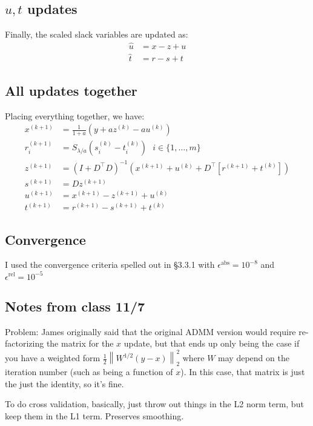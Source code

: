 \documentclass{article}
\newcommand{\norm}[1]{{ \ensuremath{ \left\lVert  #1 \right\rVert  }  }}
\begin{document}
\subsection{$u, t$ updates}
Finally, the scaled slack variables are updated as:
\begin{align*}
\hat{u}&=x-z+u\\
\hat{t}&=r-s+t
\end{align*}

\subsection{All updates together}
Placing everything together, we have:
\begin{align*}
x^{(k+1)}&=\frac{1}{1+a}\left(y+az^{(k)}-au^{(k)}\right)\\
r_i^{(k+1)}&=S_{\lambda/a}\left(s_i^{(k)}-t_i^{(k)}\right)~~~i\in\{1,\ldots, m\}\\
z^{(k+1)}&=(I+D^\top D)^{-1}\left(x^{(k+1)}+u^{(k)}+D^\top[r^{(k+1)}+t^{(k)}]\right)\\
s^{(k+1)}&=Dz^{(k+1)}\\
u^{(k+1)}&=x^{(k+1)}-z^{(k+1)}+u^{(k)}\\
t^{(k+1)}&=r^{(k+1)}-s^{(k+1)}+t^{(k)}
\end{align*}

\subsection{Convergence}
I used the convergence criteria spelled out in \cite{boyd2011distributed} \S3.3.1 with $\epsilon^{\textrm{abs}}=10^{-8}$ and $\epsilon^{\textrm{rel}}=10^{-5}$

\subsection{Notes from class 11/7}
Problem: James originally said that the original ADMM version would require re-factorizing the matrix for the $x$
update, but that ends up only being the case if you have a weighted form $\frac{1}{2}\norm{W^{1/2}(y-x)}_2^2$ where $W$ may depend on the iteration number (such as being a function of $x$). In this case, that matrix is just the
just the identity, so it's fine.

To do cross validation, basically, just throw out things in the L2 norm term, but keep them in the L1 term. Preserves smoothing.
\end{document}
